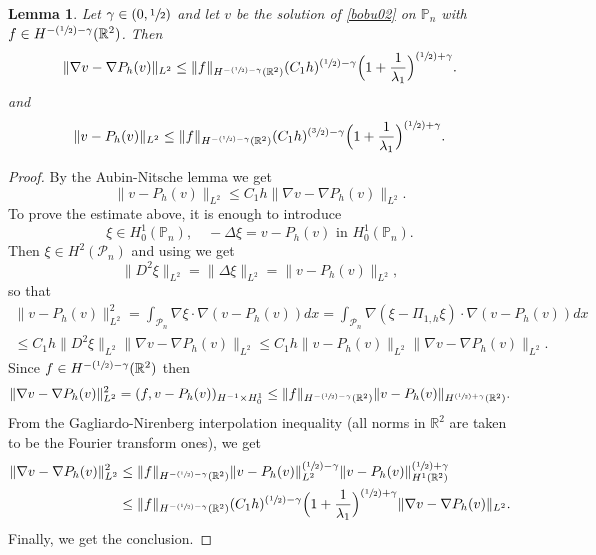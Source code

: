 \documentclass[11pt]{article}
\numberwithin{equation}{section}\newtheorem*{jepEnonce}{\jepEnonceTitle}\newenvironment{enonce*}[1]{\def\jepEnonceTitle{#1}\jepEnonce}{\endjepEnonce}\newtheorem*{conj*}{Conjecture}
\newcommand{\Psfrac}[2]{(\sfrac{#1}{#2})}
\theoremstyle{plain}
\newtheorem{lemma}[thm]{Lemma}
\theoremstyle{definition}
\let\Bbb\mathbb
\def\R{\mathbb{R}}
\let\jepOriginalSfrac\sfrac
\renewcommand{\sfrac}[2]{{\jepOriginalSfrac{#1}{#2}}}
\begin{document}
\begin{lemma}\label{bobu36.l}
Let $\gamma \in (0, \sfrac 12)$ and let $v$ be the solution of \eqref{bobu02} on $\Bbb P_n$ with $f \in H^{-\Psfrac 12 -\gamma} (\R^2)$. Then
\begin{equation}\label{bobu36}
\|\nabla v- \nabla P_h(v)\|_{L^2} \le \|f\|_{H^{-\Psfrac 12 -\gamma} (\R^2)} (C_1 h)^{\Psfrac 12 -\gamma}\Bigl(1+\frac {1}{\lambda_1}\Bigr)^{\Psfrac 12 +\gamma}. \end{equation}
and
\begin{equation}\label{bobu36.2}
\| v- P_h(v)\|_{L^2} \le \|f\|_{H^{-\Psfrac 12 -\gamma} (\R^2)} (C_1 h)^{\Psfrac 32 -\gamma}\Bigl(1+\frac {1}{\lambda_1}\Bigr)^{\Psfrac 12 +\gamma}. \end{equation}
\end{lemma}
\begin{proof}
By the Aubin-Nitsche lemma \cite[p.\,136]{CiarletBook} we get
\[
\|v-P_h(v)\|_{L^2} \le C_1h \|\nabla v-\nabla P_h(v)\|_{L^2}.
\]
To prove the estimate above, it is enough to introduce
\[
\xi \in H^1_0(\Bbb P_n),\quad -\Delta \xi = v-P_h(v) \mbox{ in } H^1_0(\Bbb P_n).
\]
Then $\xi \in H^2(\mathcal P_n)$ and using \cite[Th.\,4.3.1.4]{grisvard} we get
\[
\|D^2 \xi\|_{L^2} = \|\Delta \xi\|_{L^2} = \|v-P_h(v)\|_{L^2},
\]
so that
\vspace*{-5pt}
\begin{multline*}
\|v-P_h(v)\|_{L^2}^2 = \int_{\mathcal P_n} \nabla \xi\cdot \nabla (v-P_h(v)) dx = \int_{\mathcal P_n} \nabla (\xi-\Pi_{1,h} \xi)\cdot \nabla (v-P_h(v)) dx\\
\le C_1h \|D^2 \xi\|_{L^2} \|\nabla v-\nabla P_h(v) \|_{L^2}\le C_1h \|v-P_h(v) \|_{L^2} \|\nabla v-\nabla P_h(v) \|_{L^2}.
\end{multline*}
Since $f \in H^{-\Psfrac 12 -\gamma} (\R^2)$ then
\[
\|\nabla v-\nabla P_h(v)\|_{L^2}^2= (f, v-P_h(v))_{H^{-1}\times H^1_0} \le \|f\|_{H^{-\Psfrac 12 -\gamma} (\R^2)}\|v-P_h(v)\|_{H^{\Psfrac 12 +\gamma }(\R^2)}.
\]
From the Gagliardo-Nirenberg interpolation inequality (all norms in $\R^2$ are taken to be the Fourier transform ones), we get
\begin{align*}\|\nabla v-\nabla P_h(v)\|_{L^2}^2 & \le \|f\|_{H^{-\Psfrac 12 -\gamma} (\R^2)}\|v-P_h(v)\|_{L^2}^{\Psfrac 12 -\gamma}\|v-P_h(v) \|_{H^1(\R^2)}^{\Psfrac 12 +\gamma} \\
& \le \|f\|_{H^{-\Psfrac 12 -\gamma} (\R^2)} (C_1 h)^{\Psfrac 12 -\gamma}\Bigl(1+\frac {1}{\lambda_1}\Bigr)^{\Psfrac 12 +\gamma} \|\nabla v-\nabla P_h(v)\|_{L^2}.
\end{align*}
Finally, we get the conclusion.
\end{proof}
\end{document}
